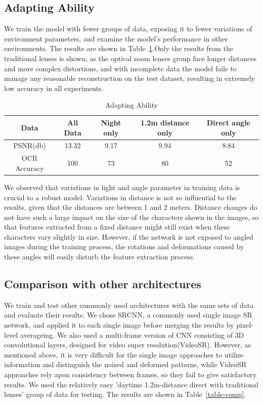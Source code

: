 \subsection{Adapting Ability}
We train the model with fewer groups of data, exposing it to fewer variations of environment parameters, and examine the model’s performance in other environments. The results are shown in Table~\ref{table-adapt}.Only the results from the traditional lenses is shown, as the optical zoom lenses group face longer distances and more complex distortions, and with incomplete data the model fails to manage any reasonable reconstruction on the test dataset, resulting in extremely low accuracy in all experiments.

\begin{table}  
\begin{tabular}{c|c|c|c|c} 
Data & All Data & Night only & 1.2m distance only & Direct angle only \\ \hline
PSNR(db) & 13.32 & 9.17 & 9.94 & 8.84\\ \hline
OCR Accuracy & 100 & 73 & 80 & 52\\
\end{tabular} 
\caption{Adapting Ability}
\label{table-adapt}
\end{table}

We observed that variations in light and angle parameter in training data is crucial to a robust model. Variations in distance is not so influential to the results, given that the distances are between 1 and 2 meters. Distance changes do not have such a large impact on the size of the characters shown in the images, so that features extracted from a fixed distance might still exist when these characters vary slightly in size. However, if the network is not exposed to angled images during the training process, the rotations and deformations caused by these angles will easily disturb the feature extraction process.

\subsection{Comparison with other architectures}
We train and test other commonly used architectures with the same sets of data and evaluate their results. We chose SRCNN, a commonly used single image SR network, and applied it to each single image before merging the results by pixel-level averageing. We also used a multi-frame version of CNN consisting of 3D convolutional layers, designed for video super resolution(VideoSR). However, as mentioned above, it is very difficult for the single image approaches to utilize information and distinguish the noized and deformed patterns, while VideoSR approaches rely apon consistency between frames, so they fail to give satisfactory results. We used the relatively easy 'daytime 1.2m-distance direct with traditional lenses' group of data for testing. The results are shown in Table~\ref{table-comp}.

